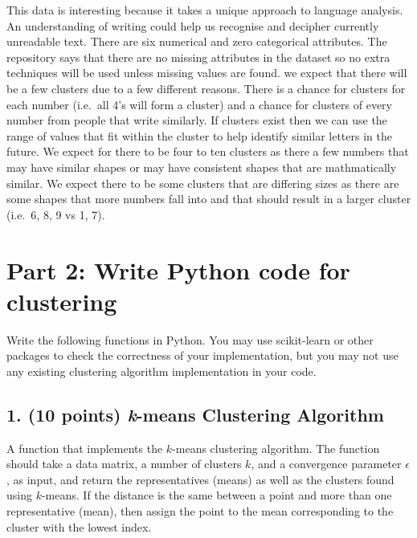 \documentclass[11pt]{article}
\begin{document}
    This data is interesting because it takes a unique approach to language
analysis. An understanding of writing could help us recognise and
decipher currently unreadable text. There are six numerical and zero
categorical attributes. The repository says that there are no missing
attributes in the dataset so no extra techniques will be used unless
missing values are found. we expect that there will be a few clusters
due to a few different reasons. There is a chance for clusters for each
number (i.e.~all 4's will form a cluster) and a chance for clusters of
every number from people that write similarly. If clusters exist then we
can use the range of values that fit within the cluster to help identify
similar letters in the future. We expect for there to be four to ten
clusters as there a few numbers that may have similar shapes or may have
consistent shapes that are mathmatically similar. We expect there to be
some clusters that are differing sizes as there are some shapes that
more numbers fall into and that should result in a larger cluster
(i.e.~6, 8, 9 vs 1, 7).

    \hypertarget{part-2-write-python-code-for-clustering}{%
\section*{Part 2: Write Python code for
clustering}\label{part-2-write-python-code-for-clustering}}

    Write the following functions in Python. You may use scikit-learn or
other packages to check the correctness of your implementation, but you
may not use any existing clustering algorithm implementation in your
code.

    \hypertarget{points-k-means-clustering-algorithm}{%
\subsection*{\texorpdfstring{1. (10 points) \emph{k}-means Clustering
Algorithm}{1. (10 points) k-means Clustering Algorithm}}\label{points-k-means-clustering-algorithm}}

    A function that implements the \(k\)-means clustering algorithm. The
function should take a data matrix, a number of clusters \(k\), and a
convergence parameter \(\epsilon\), as input, and return the
representatives (means) as well as the clusters found using \(k\)-means.
If the distance is the same between a point and more than one
representative (mean), then assign the point to the mean corresponding
to the cluster with the lowest index.
\end{document}
